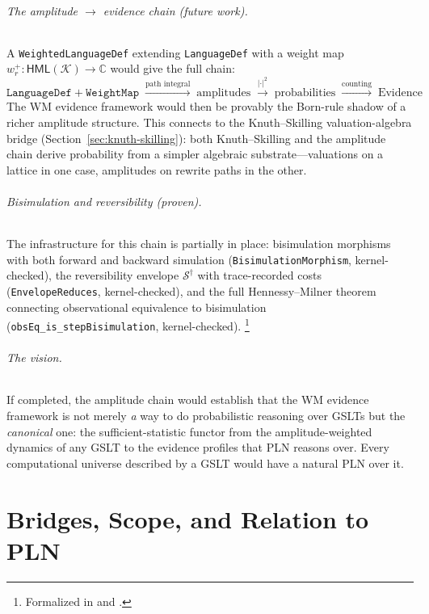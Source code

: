 \documentclass[11pt,openany]{report}
\begin{document}
\paragraph{The amplitude $\to$ evidence chain (future work).}
A \texttt{WeightedLanguageDef} extending \texttt{LanguageDef} with a
weight map $w_r^+ : \mathsf{HML}(\mathcal{K}) \to \mathbb{C}$
would give the full chain:
\[
  \texttt{LanguageDef} + \texttt{WeightMap}
  \;\xrightarrow{\text{path integral}}\;
  \text{amplitudes}
  \;\xrightarrow{|\cdot|^2}\;
  \text{probabilities}
  \;\xrightarrow{\text{counting}}\;
  \text{Evidence}
\]
The WM evidence framework would then be provably the Born-rule
shadow of a richer amplitude structure.  This connects to the
Knuth--Skilling valuation-algebra bridge
(Section~\ref{sec:knuth-skilling}): both Knuth--Skilling and the
amplitude chain derive probability from a simpler algebraic
substrate---valuations on a lattice in one case, amplitudes on
rewrite paths in the other.

\paragraph{Bisimulation and reversibility (proven).}
The infrastructure for this chain is partially in place:
bisimulation morphisms with both forward and backward simulation
(\texttt{BisimulationMorphism}, kernel-checked), the reversibility
envelope $\mathcal{S}^\dagger$ with trace-recorded costs
(\texttt{EnvelopeReduces}, kernel-checked), and the full
Hennessy--Milner theorem connecting observational equivalence to
bisimulation (\texttt{obsEq\_is\_stepBisimulation},
kernel-checked).%
\footnote{Formalized in
   and
  .}

\paragraph{The vision.}
If completed, the amplitude chain would establish that the WM evidence
framework is not merely \emph{a} way to do probabilistic reasoning over
GSLTs but the \emph{canonical} one: the sufficient-statistic functor
from the amplitude-weighted dynamics of any GSLT to the evidence profiles
that PLN reasons over.  Every computational universe described by a
GSLT would have a natural PLN over it.


\part{Bridges, Scope, and Relation to PLN}
\label{part:artifact}
\end{document}
